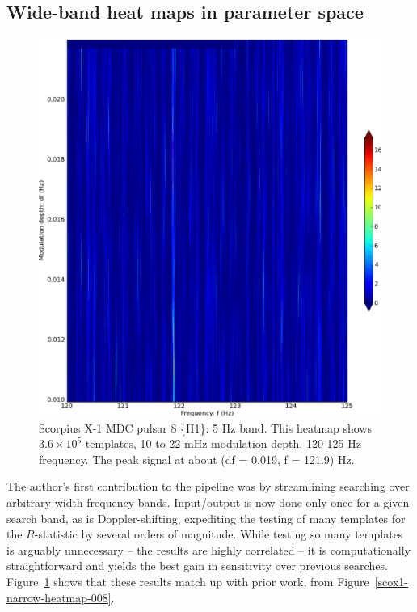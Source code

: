
\subsection{Wide-band heat maps in parameter space}

\begin{figure}
\begin{center}
\includegraphics[width=0.8\paperwidth,height=0.62\paperheight]{bandH1.eps}
\caption{Scorpius X-1 MDC pulsar 8 \{H1\}: 5 Hz band. This heatmap shows $3.6\times10^{5}$ templates, 10 to 22 mHz modulation depth, 120-125 Hz frequency. The peak signal at about (df = 0.019, f = 121.9) Hz.
}
\label{scox1-wide-heatmap-008}
\end{center}
\end{figure}

The author's first contribution to the pipeline was by streamlining searching over arbitrary-width frequency bands.
Input/output is now done only once for a given search band, as is Doppler-shifting, expediting the testing of many templates for the $R$-statistic by several orders of magnitude.
While testing so many templates is arguably unnecessary -- the results are highly correlated -- it is computationally straightforward and yields the best gain in sensitivity over previous searches.
Figure~\ref{scox1-wide-heatmap-008} shows that these results match up with prior work, from Figure~\ref{scox1-narrow-heatmap-008}.

